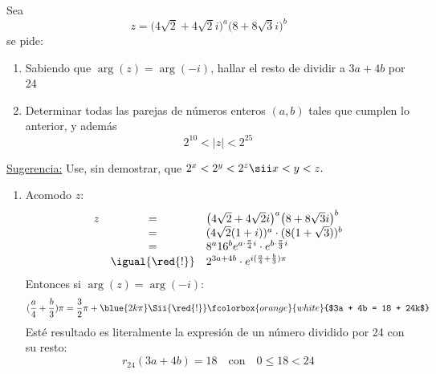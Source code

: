 \begin{enunciado}{\ejExtra}
  Sea
  $$
    z = \big(4\sqrt{2} + 4\sqrt{2}i\big)^a \big(8+8\sqrt{3}i\big)^b
  $$
  se pide:
  \begin{enumerate}[label=\alph*)]
    \item Sabiendo que $\arg(z) = \arg(-i)$, hallar el resto de dividir a $3a + 4b$ por 24
    \item Determinar todas las parejas de números enteros $(a,b)$ tales que cumplen lo anterior, y además
          $$
            2^{10} < |z| < 2 ^{25}
          $$
  \end{enumerate}
  \underline{Sugerencia:} Use, sin demostrar, que $2^x < 2^y < 2^z \sii x < y < z.$
\end{enunciado}

\begin{enumerate}[label=\alph*)]
  \item
        Acomodo $z$:
        $$
          \begin{array}{rcl}
            z & =               & \big(4\sqrt{2} + 4\sqrt{2}i\big)^a \big(8+8\sqrt{3}i\big)^b             \\
              & =               & (4\sqrt{2} ( 1 + i ))^a \cdot (8(1 + \sqrt{3}))^b                       \\
              & =               & 8^a 16^b  e^{a \cdot \frac{\pi}{4} i} \cdot e^{b \cdot \frac{\pi}{3} i} \\
              & \igual{\red{!}} & 2^{3a + 4b} \cdot e^{i (\frac{a}{4}  +  \frac{b}{3} ) \pi}
          \end{array}
        $$
        Entonces si $\arg(z) = \arg(-i)$:
        $$
          (\frac{a}{4}  +  \frac{b}{3} ) \pi = \frac{3}{2} \pi + \blue{2k\pi}
          \Sii{\red{!}}
          \fcolorbox{orange}{white}{$3a  +  4b = 18 + 24k$}
        $$
        Esté resultado es literalmente la expresión de un número dividido por 24 con su resto:
        $$
          r_{24}(3a+4b) = 18 \quad \text{con} \quad 0\leq 18 < 24
        $$


\end{enumerate}
